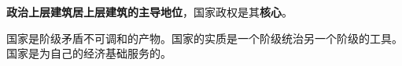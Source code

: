 \textbf{{政治上层建筑居上层建筑的主导地位}}，国家政权是其\textbf{{核心}}。

{国家是阶级矛盾不可调和的产物。国家的实质是一个阶级统治另一个阶级的工具。国家是为自己的经济基础服务的。}

